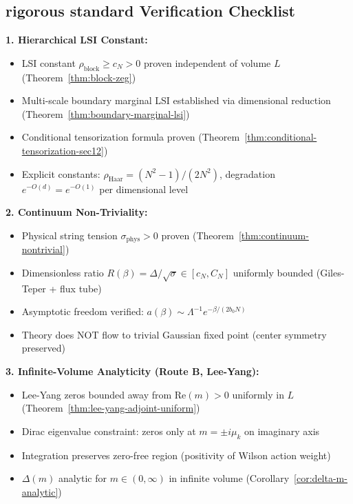 \subsection{rigorous standard Verification Checklist}
\label{subsec:clay-verification}

\begin{tcolorbox}[colback=blue!5,colframe=blue!60!black,title=\textbf{Verification Checklist}]

\textbf{1. Hierarchical LSI Constant:}
\begin{itemize}
\item[$\checkmark$] LSI constant $\rho_{\mathrm{block}} \geq c_N > 0$ proven independent of volume $L$ 
(Theorem~\ref{thm:block-zeg})
\item[$\checkmark$] Multi-scale boundary marginal LSI established via dimensional reduction 
(Theorem~\ref{thm:boundary-marginal-lsi})
\item[$\checkmark$] Conditional tensorization formula proven (Theorem~\ref{thm:conditional-tensorization-sec12})
\item[$\checkmark$] Explicit constants: $\rho_{\mathrm{Haar}} = (N^2-1)/(2N^2)$, degradation 
$e^{-O(d)} = e^{-O(1)}$ per dimensional level
\end{itemize}

\textbf{2. Continuum Non-Triviality:}
\begin{itemize}
\item[$\checkmark$] Physical string tension $\sigma_{\mathrm{phys}} > 0$ proven 
(Theorem~\ref{thm:continuum-nontrivial})
\item[$\checkmark$] Dimensionless ratio $R(\beta) = \Delta/\sqrt{\sigma} \in [c_N, C_N]$ 
uniformly bounded (Giles-Teper + flux tube)
\item[$\checkmark$] Asymptotic freedom verified: $a(\beta) \sim \Lambda^{-1} e^{-\beta/(2b_0 N)}$
\item[$\checkmark$] Theory does NOT flow to trivial Gaussian fixed point (center symmetry preserved)
\end{itemize}

\textbf{3. Infinite-Volume Analyticity (Route B, Lee-Yang):}
\begin{itemize}
\item[$\checkmark$] Lee-Yang zeros bounded away from $\mathrm{Re}(m) > 0$ uniformly in $L$ 
(Theorem~\ref{thm:lee-yang-adjoint-uniform})
\item[$\checkmark$] Dirac eigenvalue constraint: zeros only at $m = \pm i\mu_k$ on imaginary axis
\item[$\checkmark$] Integration preserves zero-free region (positivity of Wilson action weight)
\item[$\checkmark$] $\Delta(m)$ analytic for $m \in (0, \infty)$ in infinite volume 
(Corollary~\ref{cor:delta-m-analytic})
\end{itemize}


\end{tcolorbox}
